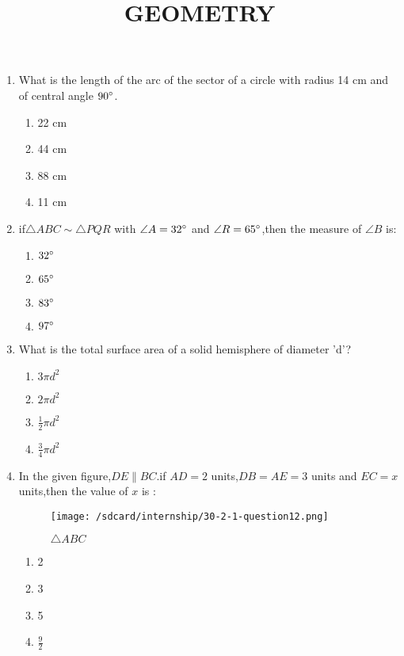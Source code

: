 \documentclass{article}
\title{GEOMETRY}
\begin{document}
\maketitle
\begin{enumerate}
    \item What is the length of the arc of the sector of a circle with radius 14 cm and of central angle $90\degree$.
    \begin{enumerate}
        \item 22 cm
        \item 44 cm
        \item 88 cm
        \item 11 cm
    \end{enumerate}
    \item if$\triangle ABC \sim \triangle PQR$ with $\angle A=32\degree$ and $\angle R=65\degree$,then the measure of $\angle B$ is:
    \begin{enumerate}
        \item $32\degree$
        \item $65\degree$
        \item $83\degree$
        \item $97\degree$
    \end{enumerate}
    \item What is the total surface area of a solid hemisphere of diameter 'd'?
    \begin{enumerate}
        \item $3 \pi d^2$
        \item $2 \pi d^2$
        \item $\frac{1}{2} \pi d^2$
        \item $\frac{3}{4} \pi d^2$
    \end{enumerate}
    \item In the given figure,$DE \parallel BC$.if $AD=2$ units,$DB=AE=3$ units and $EC=x$ units,then the value of $x$ is :
        \begin{figure}[h]
            \centering
            \texttt{[image: /sdcard/internship/30-2-1-question12.png]}\\
            \caption{$\triangle ABC$}
            \label{}
        \end{figure}
            \begin{enumerate}
                \item 2
                \item 3
                \item 5
                \item $\frac{9}{2}$

\end{enumerate}
\end{enumerate}
\end{document}
